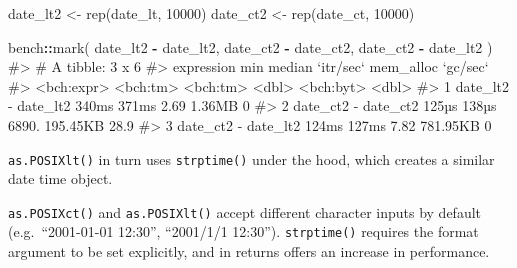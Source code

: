 \documentclass[
]{krantz}
\makeatletter
\newenvironment{Shaded}{\begin{snugshade}}{\end{snugshade}}
\newcommand{\CommentTok}[1]{\textcolor[rgb]{0.56,0.35,0.01}{\textit{#1}}}
\newcommand{\DataTypeTok}[1]{\textcolor[rgb]{0.13,0.29,0.53}{#1}}
\newcommand{\DecValTok}[1]{\textcolor[rgb]{0.00,0.00,0.81}{#1}}
\newcommand{\KeywordTok}[1]{\textcolor[rgb]{0.13,0.29,0.53}{\textbf{#1}}}
\newcommand{\NormalTok}[1]{#1}
\newcommand{\OperatorTok}[1]{\textcolor[rgb]{0.81,0.36,0.00}{\textbf{#1}}}
\newcommand{\StringTok}[1]{\textcolor[rgb]{0.31,0.60,0.02}{#1}}
\newenvironment{kframe}{%
\medskip{}
\setlength{\fboxsep}{.8em}
 \def\at@end@of@kframe{}%
 \ifinner\ifhmode%
  \def\at@end@of@kframe{\end{minipage}}%
  \begin{minipage}{\columnwidth}%
 \fi\fi%
 \def\FrameCommand##1{\hskip\@totalleftmargin \hskip-\fboxsep
 \colorbox{shadecolor}{##1}\hskip-\fboxsep
     \hskip-\linewidth \hskip-\@totalleftmargin \hskip\columnwidth}%
 \MakeFramed {\advance\hsize-\width
   \@totalleftmargin\z@ \linewidth\hsize
   \@setminipage}}%
 {\par\unskip\endMakeFramed%
 \at@end@of@kframe}
\renewenvironment{Shaded}{\begin{kframe}}{\end{kframe}}
\renewcommand{\KeywordTok} [1]{\textcolor[rgb]{0.00,0.44,0.13}{{#1}}}
\renewcommand{\DataTypeTok}[1]{\textcolor[rgb]{0.56,0.13,0.00}{{#1}}}
\renewcommand{\DecValTok}  [1]{\textcolor[rgb]{0.25,0.63,0.44}{{#1}}}
\renewcommand{\StringTok}  [1]{\textcolor[rgb]{0.25,0.44,0.63}{{#1}}}
\renewcommand{\CommentTok} [1]{\textcolor[rgb]{0.38,0.63,0.69}{{#1}}}
\renewcommand{\NormalTok}  [1]{{#1}}
\makeatother
\begin{document}
\begin{Shaded}
\begin{Highlighting}[]
\NormalTok{date_lt2 <-}\StringTok{ }\KeywordTok{rep}\NormalTok{(date_lt, }\DecValTok{10000}\NormalTok{)}
\NormalTok{date_ct2 <-}\StringTok{ }\KeywordTok{rep}\NormalTok{(date_ct, }\DecValTok{10000}\NormalTok{)}

\NormalTok{bench}\OperatorTok{::}\KeywordTok{mark}\NormalTok{(}
\NormalTok{  date_lt2 }\OperatorTok{-}\StringTok{ }\NormalTok{date_lt2, }
\NormalTok{  date_ct2 }\OperatorTok{-}\StringTok{ }\NormalTok{date_ct2,}
\NormalTok{  date_ct2 }\OperatorTok{-}\StringTok{ }\NormalTok{date_lt2}
\NormalTok{)}
\CommentTok{#> # A tibble: 3 x 6}
\CommentTok{#>   expression               min   median `itr/sec` mem_alloc `gc/sec`}
\CommentTok{#>   <bch:expr>          <bch:tm> <bch:tm>     <dbl> <bch:byt>    <dbl>}
\CommentTok{#> 1 date_lt2 - date_lt2    340ms    371ms      2.69    1.36MB      0  }
\CommentTok{#> 2 date_ct2 - date_ct2    125µs    138µs   6890.    195.45KB     28.9}
\CommentTok{#> 3 date_ct2 - date_lt2    124ms    127ms      7.82  781.95KB      0}
\end{Highlighting}
\end{Shaded}

\texttt{as.POSIXlt()} in turn uses \texttt{strptime()} under the hood, which creates a similar date time object.

\begin{Shaded}
\end{Shaded}

\texttt{as.POSIXct()} and \texttt{as.POSIXlt()} accept different character inputs by default (e.g.~``2001-01-01 12:30'', ``2001/1/1 12:30''). \texttt{strptime()} requires the format argument to be set explicitly, and in returns offers an increase in performance.
\end{document}
